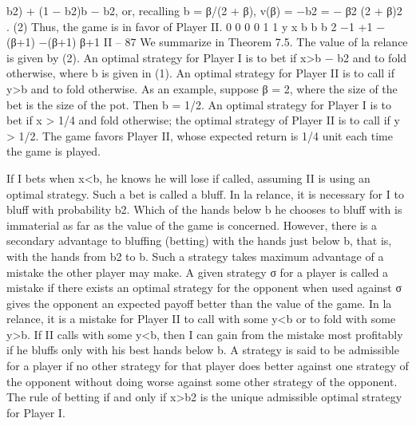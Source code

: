 \documentclass[]{report}
\begin{document}
b2) + (1 − b2)b − b2, or, recalling b = β/(2 + β),
v(β) = −b2 = − β2
(2 + β)2 . (2)
Thus, the game is in favor of Player II.
0
0
0
0
1
1
y
x
b
b b 2
−1
+1
−(β+1)
−(β+1)
β+1
II – 87
We summarize in
Theorem 7.5. The value of la relance is given by (2). An optimal strategy for Player I
is to bet if x>b − b2 and to fold otherwise, where b is given in (1). An optimal strategy
for Player II is to call if y>b and to fold otherwise.
As an example, suppose β = 2, where the size of the bet is the size of the pot. Then
b = 1/2. An optimal strategy for Player I is to bet if x > 1/4 and fold otherwise; the
optimal strategy of Player II is to call if y > 1/2. The game favors Player II, whose
expected return is 1/4 unit each time the game is played.

If I bets when x<b, he knows he will lose if called, assuming II is using an optimal
strategy. Such a bet is called a bluff. In la relance, it is necessary for I to bluff with
probability b2. Which of the hands below b he chooses to bluff with is immaterial as far as
the value of the game is concerned. However, there is a secondary advantage to bluffing
(betting) with the hands just below b, that is, with the hands from b2 to b. Such a strategy
takes maximum advantage of a mistake the other player may make.
A given strategy σ for a player is called a mistake if there exists an optimal strategy
for the opponent when used against σ gives the opponent an expected payoff better than
the value of the game. In la relance, it is a mistake for Player II to call with some y<b
or to fold with some y>b. If II calls with some y<b, then I can gain from the mistake
most profitably if he bluffs only with his best hands below b.
A strategy is said to be admissible for a player if no other strategy for that player
does better against one strategy of the opponent without doing worse against some other
strategy of the opponent. The rule of betting if and only if x>b2 is the unique admissible
optimal strategy for Player I.
\end{document}
